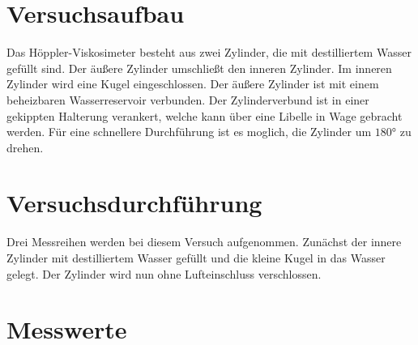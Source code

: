 


\section{Versuchsaufbau}
Das Höppler-Viskosimeter besteht aus zwei Zylinder, die mit destilliertem Wasser gefüllt sind. 
Der äußere Zylinder umschließt den inneren Zylinder. Im inneren Zylinder wird eine Kugel 
eingeschlossen. Der äußere Zylinder ist mit einem beheizbaren Wasserreservoir verbunden. 
Der Zylinderverbund ist in einer gekippten Halterung verankert, welche kann über eine Libelle 
in Wage gebracht werden. Für eine schnellere Durchführung ist es moglich, die Zylinder um 
$\ang{180;;}$ zu drehen.


\section{Versuchsdurchführung}
Drei Messreihen werden bei diesem Versuch aufgenommen. Zunächst der innere Zylinder mit 
destilliertem Wasser gefüllt und die kleine Kugel in das Wasser gelegt. Der Zylinder wird nun 
ohne Lufteinschluss verschlossen.  




\section{Messwerte}



